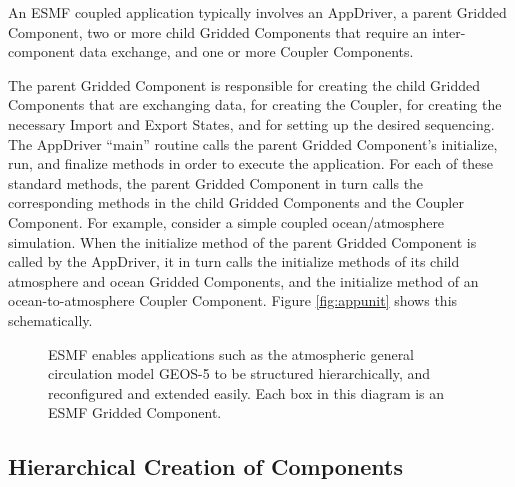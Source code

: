 An ESMF coupled application typically involves an AppDriver, a parent 
Gridded Component, two or more child Gridded Components that require 
an inter-component data exchange, and one or more Coupler 
Components. 

The parent Gridded Component is responsible for creating the child 
Gridded Components that are exchanging data, for creating the Coupler, 
for creating the necessary Import and Export States, and for 
setting up the desired sequencing.  The AppDriver ``main'' routine
calls the parent Gridded Component's initialize, run, and finalize 
methods in order to execute the application.  For each of these
standard methods, the parent Gridded Component in turn calls the 
corresponding methods in the child Gridded Components and the 
Coupler Component.  For example, consider a simple coupled 
ocean/atmosphere simulation.  When the initialize method of the 
parent Gridded Component is called by the AppDriver, it in turn 
calls the initialize methods of its child atmosphere and ocean 
Gridded Components, and the initialize method of an 
ocean-to-atmosphere Coupler Component.  Figure \ref{fig:appunit}
shows this schematically.

\begin{center}
\begin{figure}
\caption{ESMF enables applications such as the atmospheric general
circulation model GEOS-5 to be structured hierarchically, and 
reconfigured and extended easily.  Each box in this diagram is an
ESMF Gridded Component.}
\label{fig:GEOS5}
\end{figure}
\end{center}

\subsection{Hierarchical Creation of Components}
\label{sec:hierarchy}

